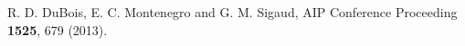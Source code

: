 \documentclass[10pt,showpacs,twocolumn]{revtex4}
\begin{document}
\begin{thebibliography}{}
R. D. DuBois, E. C. Montenegro and G. M. Sigaud,
AIP Conference Proceeding \textbf{1525}, 679 (2013).

\end{thebibliography}
\end{document}
